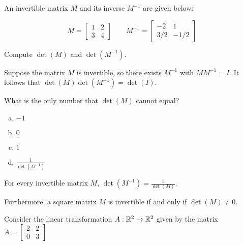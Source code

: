 
\begin{applicationActivities}{3}{27}

\begin{activity}{5}
  An invertible matrix \(M\) and its inverse \(M^{-1}\) are given below:

  \[
    M=\begin{bmatrix}1&2\\3&4\end{bmatrix}
  \hspace{2em}
    M^{-1}=\begin{bmatrix}-2&1\\3/2&-1/2\end{bmatrix}
  \]

  Compute \(\det(M)\) and \(\det(M^{-1})\).
\end{activity}

\begin{activity}{5}
  Suppose the matrix \(M\) is invertible, so there exists \(M^{-1}\)
  with \(MM^{-1}=I\). It follows that \(\det(M)\det(M^{-1})=\det(I)\).

  What is the only number that \(\det(M)\) cannot equal?
  \begin{multicols}{4}
  \begin{enumerate}[(a)]
  \item \(-1\)
  \item \(0\)
  \item \(1\)
  \item \(\frac{1}{\det(M^{-1})}\)
  \end{enumerate}
  \end{multicols}
\end{activity}

\begin{fact}
  For every invertible matrix \(M\),
  \(\det(M^{-1})=\frac{1}{\det(M)}\).

  Furthermore,
  a square matrix \(M\) is invertible if and only if \(\det(M)\not=0\).
\end{fact}

\begin{observation}
Consider the linear transformation $A : \mathbb{R}^2 \rightarrow \mathbb{R}^2$ given by the matrix $A = \begin{bmatrix} 2 & 2 \\ 0 & 3 \end{bmatrix}$


\end{observation}
\end{applicationActivities}
